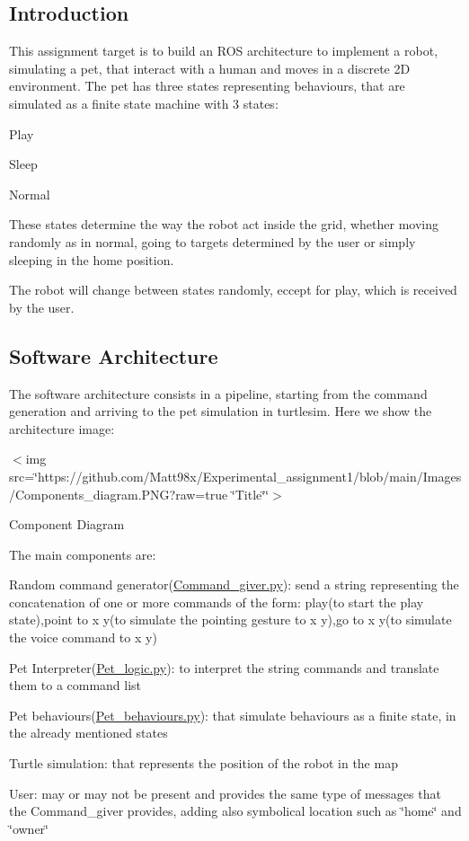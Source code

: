 \subsection*{Introduction}

This assignment target is to build an R\+OS architecture to implement a robot, simulating a pet, that interact with a human and moves in a discrete 2D environment. The pet has three states representing behaviours, that are simulated as a finite state machine with 3 states\+:
\begin{DoxyItemize}
\item Play
\item Sleep
\item Normal
\end{DoxyItemize}

These states determine the way the robot act inside the grid, whether moving randomly as in normal, going to targets determined by the user or simply sleeping in the home position.

The robot will change between states randomly, eccept for play, which is received by the user.

\subsection*{Software Architecture}

The software architecture consists in a pipeline, starting from the command generation and arriving to the pet simulation in turtlesim. Here we show the architecture image\+: 

$<$img src=\char`\"{}https\+://github.\+com/\+Matt98x/\+Experimental\+\_\+assignment1/blob/main/\+Images/\+Components\+\_\+diagram.\+P\+N\+G?raw=true \char`\"{}Title\char`\"{}\char`\"{}$>$ 

Component Diagram 

The main components are\+:
\begin{DoxyItemize}
\item Random command generator(\hyperlink{Command__giver_8py}{Command\+\_\+giver.\+py})\+: send a string representing the concatenation of one or more commands of the form\+: \textquotesingle{}play\textquotesingle{}(to start the play state),\textquotesingle{}point to x y\textquotesingle{}(to simulate the pointing gesture to x y),\textquotesingle{}go to x y\textquotesingle{}(to simulate the voice command to x y)
\item Pet Interpreter(\hyperlink{Pet__logic_8py}{Pet\+\_\+logic.\+py})\+: to interpret the string commands and translate them to a command list
\item Pet behaviours(\hyperlink{Pet__behaviours_8py}{Pet\+\_\+behaviours.\+py})\+: that simulate behaviours as a finite state, in the already mentioned states
\item Turtle simulation\+: that represents the position of the robot in the map
\item User\+: may or may not be present and provides the same type of messages that the Command\+\_\+giver provides, adding also symbolical location such as \char`\"{}home\char`\"{} and \char`\"{}owner\char`\"{}
\end{DoxyItemize}

